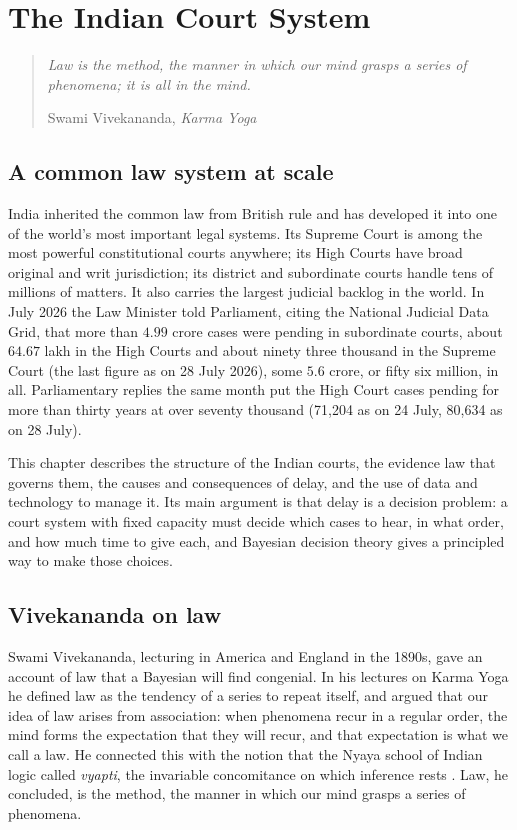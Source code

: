 \chapter{The Indian Court System}
\label{ch:india}

\begin{quote}\itshape
Law is the method, the manner in which our mind grasps a series of phenomena; it is all in the mind.
\par\hfill\normalfont Swami Vivekananda, \emph{Karma Yoga}
\end{quote}

\section{A common law system at scale}

India inherited the common law from British rule and has developed it into one of the world's most important legal systems. Its Supreme Court is among the most powerful constitutional courts anywhere; its High Courts have broad original and writ jurisdiction; its district and subordinate courts handle tens of millions of matters. It also carries the largest judicial backlog in the world. In July 2026 the Law Minister told Parliament, citing the National Judicial Data Grid, that more than $4.99$ crore cases were pending in subordinate courts, about $64.67$ lakh in the High Courts and about ninety three thousand in the Supreme Court (the last figure as on 28 July 2026), some $5.6$ crore, or fifty six million, in all. Parliamentary replies the same month put the High Court cases pending for more than thirty years at over seventy thousand (71,204 as on 24 July, 80,634 as on 28 July).

This chapter describes the structure of the Indian courts, the evidence law that governs them, the causes and consequences of delay, and the use of data and technology to manage it. Its main argument is that delay is a decision problem: a court system with fixed capacity must decide which cases to hear, in what order, and how much time to give each, and Bayesian decision theory gives a principled way to make those choices.

\section{Vivekananda on law}

Swami Vivekananda, lecturing in America and England in the 1890s, gave an account of law that a Bayesian will find congenial. In his lectures on Karma Yoga he defined law as the tendency of a series to repeat itself, and argued that our idea of law arises from association: when phenomena recur in a regular order, the mind forms the expectation that they will recur, and that expectation is what we call a law. He connected this with the notion that the Nyaya school of Indian logic called \emph{vyapti}, the invariable concomitance on which inference rests \citep{vivekananda1896}. Law, he concluded, is the method, the manner in which our mind grasps a series of phenomena.

